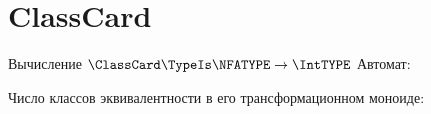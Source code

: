 \section{ClassCard}
\begin{frame}{Вычисление $\ClassCard\TypeIs\NFATYPE\to\IntTYPE$}
	Автомат:


	Число классов эквивалентности в его трансформационном моноиде:

\end{frame}
